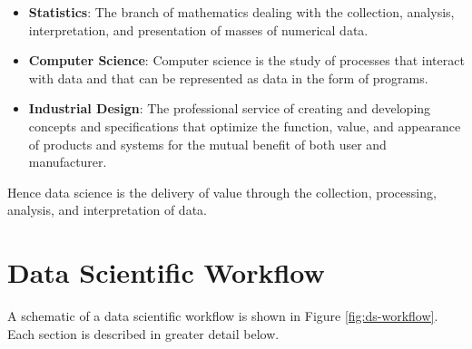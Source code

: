 \documentclass[
]{book}
\providecommand{\tightlist}{%
  \setlength{\itemsep}{0pt}\setlength{\parskip}{0pt}}
\begin{document}
\begin{itemize}
\tightlist
\item
  \textbf{Statistics}: The branch of mathematics dealing with the collection, analysis, interpretation, and presentation of masses of numerical data.
\item
  \textbf{Computer Science}: Computer science is the study of processes that interact with data and that can be represented as data in the form of programs.
\item
  \textbf{Industrial Design}: The professional service of creating and developing concepts and specifications that optimize the function, value, and appearance of products and systems for the mutual benefit of both user and manufacturer.
\end{itemize}

Hence data science is the delivery of value through the collection, processing, analysis, and interpretation of data.

\hypertarget{data-scientific-workflow}{%
\section{Data Scientific Workflow}\label{data-scientific-workflow}}

A schematic of a data scientific workflow is shown in Figure \ref{fig:ds-workflow}. Each section is described in greater detail below.
\end{document}
